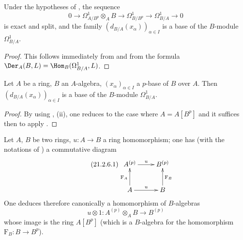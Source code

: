 \begin{corollary}[21.2.4]
\label{0.21.2.4}
Under the hypotheses of , the sequence
\begin{equation}
\tag{21.2.4.1}
  \label{0.21.2.4.1}
  0\to\Omega^1_{A/B^p}\otimes_A B\to\Omega^1_{B/B^p}\to\Omega^1_{B/A}\to 0
\end{equation}
is exact and split, and the family $(d_{B/A}(x_\alpha))_{\alpha\in I}$ is a base of the $B$-module $\Omega^1_{B/A}$.
\end{corollary}

\begin{proof}
This follows immediately from  and from the formula $\Der_A(B,L)=\Hom_B(\Omega^1_{B/A},L)$.
\end{proof}

\begin{corollary}[21.2.5]
\label{0.21.2.5}
Let $A$ be a ring, $B$ an $A$-algebra, $(x_\alpha)_{\alpha\in I}$ a $p$-base of $B$ over $A$.
Then $(d_{B/A}(x_\alpha))_{\alpha\in I}$ is a base of the $B$-module $\Omega^1_{B/A}$.
\end{corollary}

\begin{proof}
By using , (ii), one reduces to the case where $A=A[B^p]$ and it suffices then to apply .
\end{proof}

\begin{env}[21.2.6]
\label{0.21.2.6}
Let $A$, $B$ be two rings, $u:A\to B$ a ring homomorphism; one has (with the notations of ) a commutative diagram
\begin{equation}
\tag{21.2.6.1}
  \label{0.21.2.6.1}
\xymatrix{
  A^{(p)} \ar[r]^{u} & B^{(p)} \\
  A \ar[u]^{\mathrm{F}_A} \ar[r]^{u} & B \ar[u]_{\mathrm{F}_B}
}
\end{equation}
One deduces therefore canonically a homomorphism of $B$-algebras
\begin{equation}
\tag{21.2.6.2}
  \label{0.21.2.6.2}
  u\otimes 1:A^{(p)}\otimes_A B\to B^{(p)}
\end{equation}
whose image is the ring $A[B^p]$ (which is a $B$-algebra for the homomorphism $\mathrm{F}_B:B\to B^p$).
\end{env}


